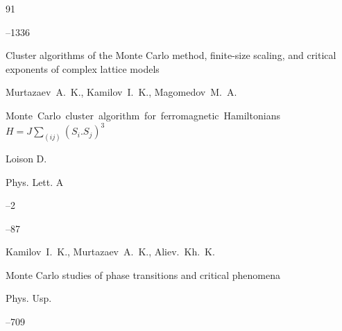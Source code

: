 \begin{thebibliography}{91}

--1336

\paper Cluster algorithms of the Monte Carlo method, finite-size scaling, and critical exponents of complex lattice models

\by Murtazaev~A.~K., Kamilov~I.~K., Magomedov~M.~A.





\paper   \mbox{Monte Carlo cluster algorithm for ferromagnetic Hamiltonians $H{=}J\! \sum_{(\!ij\!)}\!(\!S_i. S_j\!)^3$}

\by Loison D.

\jour Phys. Lett. A



--2

--87





\by Kamilov~I.~K., Murtazaev~A.~K., Aliev.~Kh.~K.

\paper Monte Carlo studies of phase transitions and critical phenomena

\jour Phys. Usp. 



–709 





\end{thebibliography}



\EngDate





\newpage

\Russian



%

%

%

%

